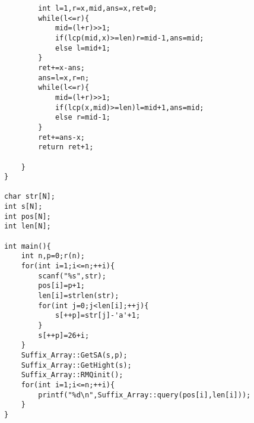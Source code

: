 \documentclass{ctexart}
\begin{document}
\begin{lstlisting}
        int l=1,r=x,mid,ans=x,ret=0;
        while(l<=r){
            mid=(l+r)>>1;
            if(lcp(mid,x)>=len)r=mid-1,ans=mid;
            else l=mid+1;
        }
        ret+=x-ans;
        ans=l=x,r=n;
        while(l<=r){
            mid=(l+r)>>1;
            if(lcp(x,mid)>=len)l=mid+1,ans=mid;
            else r=mid-1;
        }
        ret+=ans-x;
        return ret+1;
        
    }
}

char str[N];
int s[N];
int pos[N];
int len[N];

int main(){
    int n,p=0;r(n);
    for(int i=1;i<=n;++i){
        scanf("%s",str);
        pos[i]=p+1;
        len[i]=strlen(str);
        for(int j=0;j<len[i];++j){
            s[++p]=str[j]-'a'+1;
        }
        s[++p]=26+i;
    }
    Suffix_Array::GetSA(s,p);
    Suffix_Array::GetHight(s);
    Suffix_Array::RMQinit();
    for(int i=1;i<=n;++i){
        printf("%d\n",Suffix_Array::query(pos[i],len[i]));
    }
}
\end{lstlisting}
\end{document}
